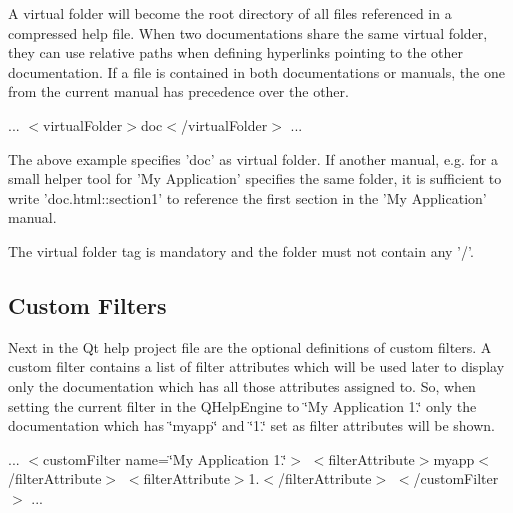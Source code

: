 A virtual folder will become the root directory of all files referenced in a compressed help file. When two documentations share the same virtual folder, they can use relative paths when defining hyperlinks pointing to the other documentation. If a file is contained in both documentations or manuals, the one from the current manual has precedence over the other.

... $<$virtual\-Folder$>$doc$<$/virtual\-Folder$>$ ...

The above example specifies 'doc' as virtual folder. If another manual, e.\-g. for a small helper tool for 'My Application' specifies the same folder, it is sufficient to write 'doc.\-html\-::section1' to reference the first section in the 'My Application' manual.

The virtual folder tag is mandatory and the folder must not contain any '/'.\hypertarget{helpproject_hp_customfilters}{}\subsection{Custom Filters}\label{helpproject_hp_customfilters}
Next in the Qt help project file are the optional definitions of custom filters. A custom filter contains a list of filter attributes which will be used later to display only the documentation which has all those attributes assigned to. So, when setting the current filter in the Q\-Help\-Engine to \char`\"{}\-My 
\-Application 1.\char`\"{} only the documentation which has \char`\"{}myapp\char`\"{} and \char`\"{}1.\char`\"{} set as filter attributes will be shown.

... $<$custom\-Filter name=\char`\"{}\-My Application 1.\char`\"{}$>$ $<$filter\-Attribute$>$myapp$<$/filter\-Attribute$>$ $<$filter\-Attribute$>$1.$<$/filter\-Attribute$>$ $<$/custom\-Filter$>$ ...

